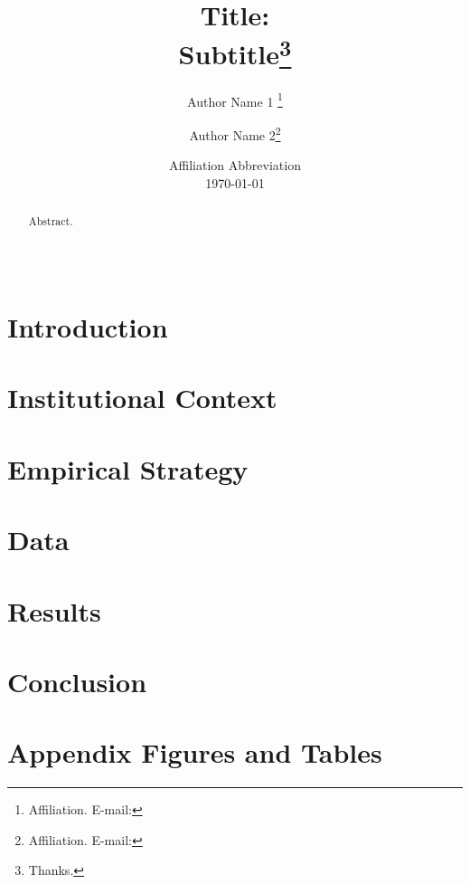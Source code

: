 \documentclass[12pt, a4paper, hidelinks]{article}
\begin{document}
\begin{titlepage}
\title{\bf{Title:}\\ \Large Subtitle\thanks{Thanks.}}
\author{Author Name 1 \thanks{Affiliation. E-mail: } \and Author Name 2\thanks{Affiliation. E-mail: }}
\date{%
    Affiliation Abbreviation \\[2ex]%
    \today
}
\maketitle
\begin{abstract}
\noindent Abstract.\\
\vspace{0in}\\
\vspace{0in}\\

\bigskip
\end{abstract}
\setcounter{page}{0}
\thispagestyle{empty}
\end{titlepage}
\pagebreak \newpage

	\section{Introduction} \label{sec:introduction}
	
	\section{Institutional Context} \label{sec:institutional}
	
	\section{Empirical Strategy} \label{sec:empirical}
	
    \section{Data} \label{sec:data}
	
	\section{Results} \label{sec:results}
	
	\section{Conclusion} \label{sec:conclusion}
	
	\newpage
	
	
	\newpage
	\appendix
	\section{Appendix Figures and Tables} \label{sec:appendix}
	\renewcommand{\thefigure}{A.\arabic{figure}}
	\renewcommand{\thetable}{A.\arabic{table}}
    \setcounter{figure}{0}
    \setcounter{table}{0}
	
\end{document}
